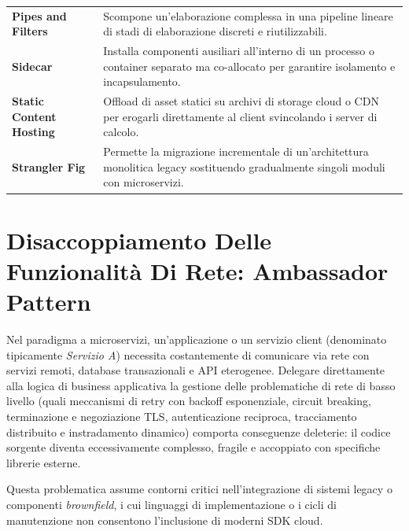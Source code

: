 \documentclass[11pt, a4paper]{article}
\begin{document}
\begin{table}[H]
\begin{tabularx}{\textwidth}{l X}
\addlinespace
\textbf{Pipes and Filters} &
Scompone un'elaborazione complessa in una pipeline lineare di stadi di elaborazione discreti e riutilizzabili. \\
\addlinespace
\textbf{Sidecar} &
Installa componenti ausiliari all'interno di un processo o container separato ma co-allocato per garantire isolamento e incapsulamento. \\
\addlinespace
\textbf{Static Content Hosting} &
Offload di asset statici su archivi di storage cloud o CDN per erogarli direttamente al client svincolando i server di calcolo. \\
\addlinespace
\textbf{Strangler Fig} &
Permette la migrazione incrementale di un'architettura monolitica legacy sostituendo gradualmente singoli moduli con microservizi. \\
\bottomrule
\end{tabularx}
\end{table}

\newpage


\section{Disaccoppiamento Delle Funzionalità Di Rete: Ambassador Pattern}

Nel paradigma a microservizi, un'applicazione o un servizio client (denominato tipicamente \emph{Servizio A}) necessita costantemente di comunicare via rete con servizi remoti, database transazionali e API eterogenee. Delegare direttamente alla logica di business applicativa la gestione delle problematiche di rete di basso livello (quali meccanismi di retry con backoff esponenziale, circuit breaking, terminazione e negoziazione TLS, autenticazione reciproca, tracciamento distribuito e instradamento dinamico) comporta conseguenze deleterie: il codice sorgente diventa eccessivamente complesso, fragile e accoppiato con specifiche librerie esterne.

Questa problematica assume contorni critici nell'integrazione di sistemi legacy o componenti \emph{brownfield}, i cui linguaggi di implementazione o i cicli di manutenzione non consentono l'inclusione di moderni SDK cloud.

\end{document}
